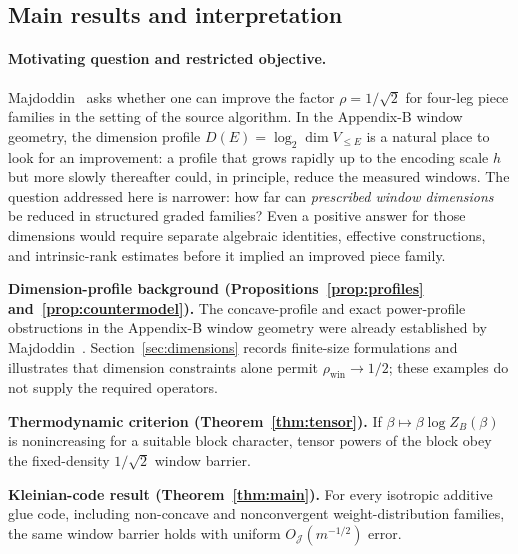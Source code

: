 \documentclass[10pt,a4paper]{article}
\numberwithin{equation}{section}
\theoremstyle{remark}\newtheorem{remark}[theorem]{Remark}\newtheorem{question}[theorem]{Question}
\newcommand{\rhow}{\rho_{\mathrm{win}}}\newcommand{\F}{\mathbb F}\newcommand{\K}{\mathbb K}\newcommand{\Z}{\mathbb Z}\newcommand{\R}{\mathbb R}\newcommand{\cB}{\mathcal L}\newcommand{\wt}{\mathrm{wt}}\newcommand{\dimn}{\operatorname{dim}}\newcommand{\supp}{\operatorname{supp}}
\begin{document}
\subsection{Main results and interpretation}
\paragraph{Motivating question and restricted objective.}
Majdoddin~\cite[Problem~1 and Section~4.7]{majdoddin} asks whether one can improve the factor $\rho=1/\sqrt2$ for four-leg piece families in the setting of the source algorithm. In the Appendix-B window geometry, the dimension profile $D(E)=\log_2\dimn V_{\le E}$ is a natural place to look for an improvement: a profile that grows rapidly up to the encoding scale $h$ but more slowly thereafter could, in principle, reduce the measured windows. The question addressed here is narrower: how far can \emph{prescribed window dimensions} be reduced in structured graded families? Even a positive answer for those dimensions would require separate algebraic identities, effective constructions, and intrinsic-rank estimates before it implied an improved piece family.

\textbf{Dimension-profile background (Propositions~\ref{prop:profiles} and~\ref{prop:countermodel}).} The concave-profile and exact power-profile obstructions in the Appendix-B window geometry were already established by Majdoddin~\cite[Section~4.7, Proposition~4.24 and subsequent discussion]{majdoddin}. Section~\ref{sec:dimensions} records finite-size formulations and illustrates that dimension constraints alone permit $\rhow\to1/2$; these examples do not supply the required operators.

\textbf{Thermodynamic criterion (Theorem~\ref{thm:tensor}).} If $\beta\mapsto\beta\log Z_B(\beta)$ is nonincreasing for a suitable block character, tensor powers of the block obey the fixed-density $1/\sqrt2$ window barrier.

\textbf{Kleinian-code result (Theorem~\ref{thm:main}).} For every isotropic additive glue code, including non-concave and nonconvergent weight-distribution families, the same window barrier holds with uniform $O_{\mathcal J}(m^{-1/2})$ error.
\end{document}

